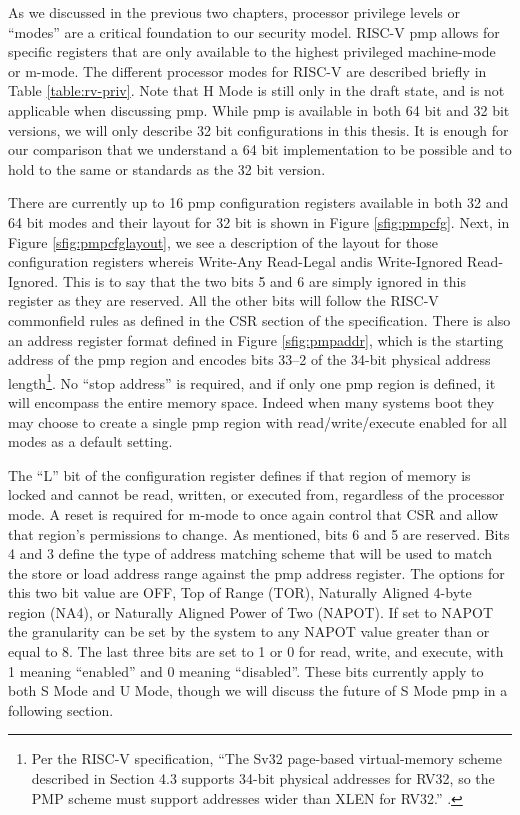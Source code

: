 As we discussed in the previous two chapters, processor privilege levels or ``modes'' are a critical foundation to our security model. RISC-V \gls{pmp} allows for specific registers that are only available to the highest privileged machine-mode or m-mode. The different processor modes for RISC-V are described briefly in Table \ref{table:rv-priv}. Note that H Mode is still only in the draft state, and is not applicable when discussing \gls{pmp}. While \gls{pmp} is available in both 64 bit and 32 bit versions, we will only describe 32 bit configurations in this thesis. It is enough for our comparison that we understand a 64 bit implementation to be possible and to hold to the same or standards as the 32 bit version. 

\renewcommand{\arraystretch}{1}


There are currently up to 16 \gls{pmp} configuration registers available in both 32 and 64 bit modes and their layout for 32 bit is shown in Figure \ref{sfig:pmpcfg}. Next, in Figure \ref{sfig:pmpcfglayout}, we see a description of the layout for those configuration registers where\;\warl\;is Write-Any Read-Legal and\;\wiri\;is Write-Ignored Read-Ignored. This is to say that the two bits 5 and 6 are simply ignored in this register as they are reserved. All the other bits will follow the RISC-V common\;\warl\;field rules as defined in the CSR section of the specification. There is also an address register format defined in Figure \ref{sfig:pmpaddr}, which is the starting address of the \gls{pmp} region and encodes bits 33--2 of the 34-bit physical address length\footnote{Per the RISC-V specification, ``The Sv32 page-based virtual-memory scheme described in Section 4.3 supports 34-bit physical addresses for RV32, so the PMP scheme must support addresses wider than XLEN for RV32.'' \cite{PrivIsa2019}.}. No ``stop address'' is required, and if only one \gls{pmp} region is defined, it will encompass the entire memory space. Indeed when many systems boot they may choose to create a single \gls{pmp} region with read/write/execute enabled for all modes as a default setting.

The ``L'' bit of the configuration register defines if that region of memory is locked and cannot be read, written, or executed from, regardless of the processor mode. A reset is required for m-mode to once again control that CSR and allow that region's permissions to change. As mentioned, bits 6 and 5 are reserved. Bits 4 and 3 define the type of address matching scheme that will be used to match the store or load address range against the \gls{pmp} address register. The options for this two bit value are OFF, Top of Range (TOR), Naturally Aligned 4-byte region (NA4), or Naturally Aligned Power of Two (NAPOT). If set to NAPOT the granularity can be set by the system to any NAPOT value greater than or equal to 8. The last three bits are set to 1 or 0 for read, write, and execute, with 1 meaning ``enabled'' and 0 meaning ``disabled''. These bits currently apply to both S Mode and U Mode, though we will discuss the future of S Mode \gls{pmp} in a following section.


